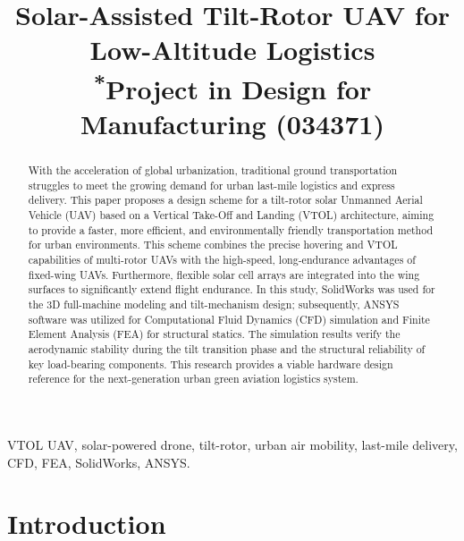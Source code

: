 \documentclass[conference]{IEEEtran}
\begin{document}
\title{Solar-Assisted Tilt-Rotor UAV for Low-Altitude Logistics\\
{\footnotesize \textsuperscript{*}Project in Design for Manufacturing (034371)}
}

\author{
}

\maketitle

\begin{abstract}
With the acceleration of global urbanization, traditional ground transportation struggles to meet the growing demand for urban last-mile logistics and express delivery. This paper proposes a design scheme for a tilt-rotor solar Unmanned Aerial Vehicle (UAV) based on a Vertical Take-Off and Landing (VTOL) architecture, aiming to provide a faster, more efficient, and environmentally friendly transportation method for urban environments. This scheme combines the precise hovering and VTOL capabilities of multi-rotor UAVs with the high-speed, long-endurance advantages of fixed-wing UAVs. Furthermore, flexible solar cell arrays are integrated into the wing surfaces to significantly extend flight endurance. In this study, SolidWorks was used for the 3D full-machine modeling and tilt-mechanism design; subsequently, ANSYS software was utilized for Computational Fluid Dynamics (CFD) simulation and Finite Element Analysis (FEA) for structural statics. The simulation results verify the aerodynamic stability during the tilt transition phase and the structural reliability of key load-bearing components. This research provides a viable hardware design reference for the next-generation urban green aviation logistics system.
\end{abstract}

\begin{IEEEkeywords}
VTOL UAV, solar-powered drone, tilt-rotor, urban air mobility, last-mile delivery, CFD, FEA, SolidWorks, ANSYS.
\end{IEEEkeywords}

\section{Introduction}
\end{document}
